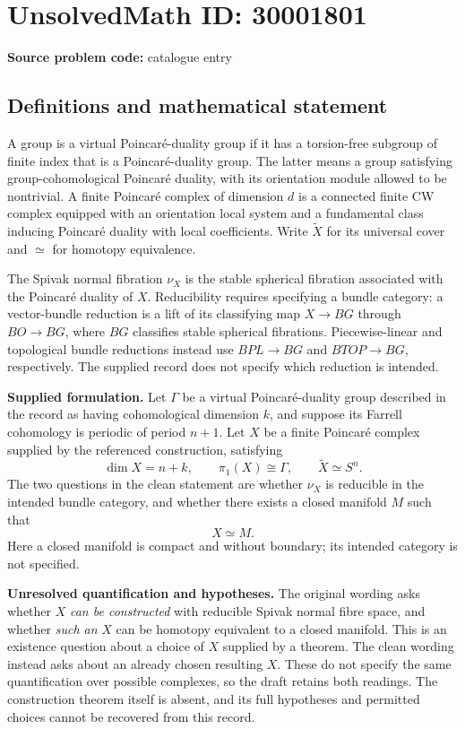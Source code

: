 \documentclass[11pt]{article}
\begin{document}
\section*{UnsolvedMath ID: 30001801}
\textbf{Source problem code:} catalogue entry
\subsection{Definitions and mathematical statement}
A group is a virtual Poincar\'e-duality group if it has a torsion-free subgroup of finite index that is a Poincar\'e-duality group. The latter means a group satisfying group-cohomological Poincar\'e duality, with its orientation module allowed to be nontrivial. A finite Poincar\'e complex of dimension \(d\) is a connected finite CW complex equipped with an orientation local system and a fundamental class inducing Poincar\'e duality with local coefficients. Write \(\widetilde X\) for its universal cover and \(\simeq\) for homotopy equivalence.

The Spivak normal fibration \(\nu_X\) is the stable spherical fibration associated with the Poincar\'e duality of \(X\). Reducibility requires specifying a bundle category: a vector-bundle reduction is a lift of its classifying map \(X\to BG\) through \(BO\to BG\), where \(BG\) classifies stable spherical fibrations. Piecewise-linear and topological bundle reductions instead use \(BPL\to BG\) and \(BTOP\to BG\), respectively. The supplied record does not specify which reduction is intended.

\textbf{Supplied formulation.} Let \(\Gamma\) be a virtual Poincar\'e-duality group described in the record as having cohomological dimension \(k\), and suppose its Farrell cohomology is periodic of period \(n+1\). Let \(X\) be a finite Poincar\'e complex supplied by the referenced construction, satisfying
\[
\dim X=n+k,\qquad \pi_1(X)\cong\Gamma,\qquad \widetilde X\simeq S^n.
\]
The two questions in the clean statement are whether \(\nu_X\) is reducible in the intended bundle category, and whether there exists a closed manifold \(M\) such that
\[
X\simeq M.
\]
Here a closed manifold is compact and without boundary; its intended category is not specified.

\textbf{Unresolved quantification and hypotheses.} The original wording asks whether \(X\) \emph{can be constructed} with reducible Spivak normal fibre space, and whether \emph{such an} \(X\) can be homotopy equivalent to a closed manifold. This is an existence question about a choice of \(X\) supplied by a theorem. The clean wording instead asks about an already chosen resulting \(X\). These do not specify the same quantification over possible complexes, so the draft retains both readings. The construction theorem itself is absent, and its full hypotheses and permitted choices cannot be recovered from this record.
\end{document}
